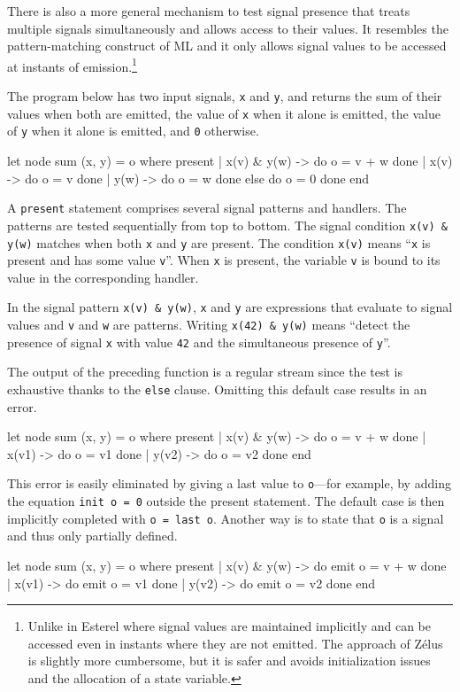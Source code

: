 \documentclass[11pt,titlepage,twoside]{report}
\makeatletter
\newcommand{\zls}[1]{{\@span{class="zelusinline"}#1}}
\newcommand{\zls}[1]{\texttt{#1}}
\renewcommand{\zls}[1]{\texttt{#1}}
\newcommand{\zelus}{{\sf Z\'elus}}
\newcommand{\esterel}{{\sf Esterel}}
\makeatother
\begin{document}
There is also a more general mechanism to test signal presence that treats 
multiple signals simultaneously and allows access to their values.
It resembles the pattern-matching construct of ML and it only allows signal 
values to be accessed at instants of emission.\footnote{Unlike in \esterel{} 
where signal values are maintained implicitly and can be accessed even in 
instants where they are not emitted.
The approach of \zelus{} is slightly more cumbersome, but it is safer and 
avoids initialization issues and the allocation of a state variable.}

The program below has two input signals, \zls{x} and \zls{y}, and
returns the sum of their values when both are emitted, the value of \zls{x} 
when it alone is emitted, the value of \zls{y} when it alone is emitted, and 
\zls{0} otherwise.
\begin{chklisting}[withresult]
let node sum (x, y) = o where
  present
  | x(v) & y(w) -> do o = v + w done
  | x(v) -> do o = v done
  | y(w) -> do o = w done
  else do o = 0 done
  end
\end{chklisting}
A \zls{present} statement comprises several signal patterns and handlers.
The patterns are tested sequentially from top to bottom.
The signal condition \zls{x(v) \& y(w)} matches when both \zls{x} and 
\zls{y} are present.
The condition \zls{x(v)} means ``\zls{x} is present and
has some value \zls{v}''.
When \zls{x} is present, the variable \zls{v} is bound to its value in the 
corresponding handler.

In the signal pattern \zls{x(v) \& y(w)}, \zls{x} and \zls{y} are
expressions that evaluate to signal values and \zls{v} and \zls{w}
are patterns. Writing \zls{x(42) \& y(w)} means ``detect the presence of 
signal \zls{x} with value \zls{42} and the simultaneous presence of 
\zls{y}''.

The output of the preceding function is a regular stream since the test is 
exhaustive thanks to the \zls{else} clause.
Omitting this default case results in an error.
\begin{chklisting}
let node sum (x, y) = o where
  present
  | x(v) & y(w) -> do o = v + w done
  | x(v1) -> do o = v1 done
  | y(v2) -> do o = v2 done
  end
\end{chklisting}
This error is easily eliminated by giving a last value to \zls{o}---for 
example, by adding the equation \zls{init o = 0} outside the present
statement. The default case is then implicitly completed with \zls{o = last 
o}.
Another way is to state that \zls{o} is a signal and thus only partially 
defined.
\begin{chklisting}[withresult]
let node sum (x, y) = o where
  present
  | x(v) & y(w) -> do emit o = v + w done
  | x(v1) -> do emit o = v1 done
  | y(v2) -> do emit o = v2 done
  end
\end{chklisting}
\end{document}
